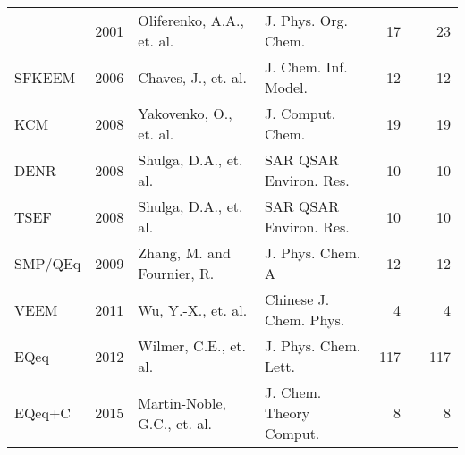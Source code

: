 \documentclass[oneside]{memoir}
\begin{document}
\begin{table}
\begin{tabular}{llllrrr}
        & 2001 & Oliferenko, A.A., et. al.     & J. Phys. Org. Chem.     &    17 & \cite{Oliferenko2001}  &    23\\
SFKEEM  & 2006 & Chaves, J., et. al.           & J. Chem. Inf. Model.    &    12 & \cite{Chaves2006}      &    12\\
KCM     & 2008 & Yakovenko, O., et. al.        & J. Comput. Chem.        &    19 & \cite{Yakovenko2008}   &    19\\
DENR    & 2008 & Shulga, D.A., et. al.         & SAR QSAR Environ. Res.  &    10 & \cite{Shulga2008}      &    10\\
TSEF    & 2008 & Shulga, D.A., et. al.         & SAR QSAR Environ. Res.  &    10 & \cite{Shulga2008}      &    10\\
SMP/QEq & 2009 & Zhang, M. and Fournier, R.    & J. Phys. Chem. A        &    12 & \cite{Zhang2009}       &    12\\
VEEM    & 2011 & Wu, Y.-X., et. al.            & Chinese J. Chem. Phys.  &     4 & \cite{Wu2011}          &     4\\
EQeq    & 2012 & Wilmer, C.E., et. al.         & J. Phys. Chem. Lett.    &   117 & \cite{Wilmer2012}      &   117\\
EQeq+C  & 2015 & Martin-Noble, G.C., et. al.   & J. Chem. Theory Comput. &     8 & \cite{MartinNoble2015} &     8\\
\bottomrule
\end{tabular}
\end{table}

\printbibliography
\end{document}
